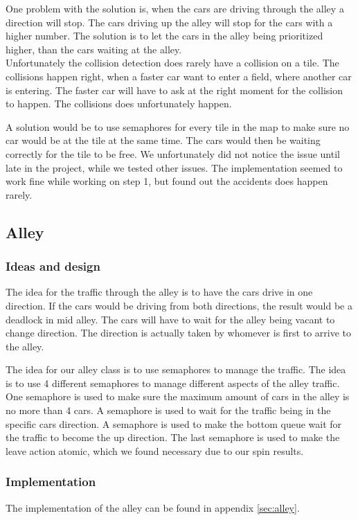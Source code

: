 One problem with the solution is, when the cars are driving through the alley a direction will stop. The cars driving up the alley will stop for the cars with a higher number. The solution is to let the cars in the alley being prioritized higher, than the cars waiting at the alley.
\\

Unfortunately the collision detection does rarely have a collision on a tile. The collisions happen right, when a faster car want to enter a field, where another car is entering. The faster car will have to ask at the right moment for the collision to happen. The collisions does unfortunately happen. 

A solution would be to use semaphores for every tile in the map to make sure no car would be at the tile at the same time. The cars would then be waiting correctly for the tile to be free. We unfortunately did not notice the issue until late in the project, while we tested other issues. The implementation seemed to work fine while working on step 1, but found out the accidents does happen rarely.

\subsection{Alley}
\subsubsection{Ideas and design}
The idea for the traffic through the alley is to have the cars drive in one direction. If the cars would be driving from both directions, the result would be a deadlock in mid alley. The cars will have to wait for the alley being vacant to change direction. The direction is actually taken by whomever is first to arrive to the alley.

The idea for our alley class is to use semaphores to manage the traffic. The idea is to use 4 different semaphores to manage different aspects of the alley traffic. One semaphore is used to make sure the maximum amount of cars in the alley is no more than 4 cars. A semaphore is used to wait for the traffic being in the specific cars direction. A semaphore is used to make the bottom queue wait for the traffic to become the up direction. The last semaphore is used to make the leave action atomic, which we found necessary due to our spin results. 

\subsubsection{Implementation}
The implementation of the alley can be found in appendix \ref{sec:alley}.
\\

